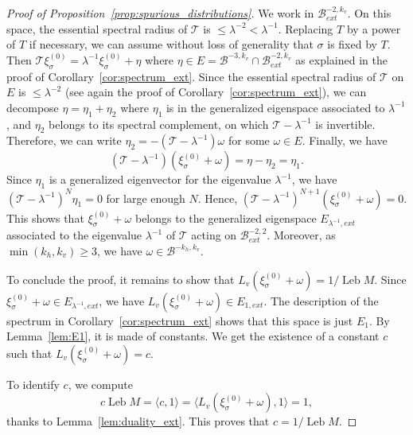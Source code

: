 \documentclass[11pt, a4paper, oneside, final, pagebackref]{amsart}
\newcommand{\boB}{\mathcal{B}}
\newcommand{\boT}{\mathcal{T}}
\DeclareMathOperator{\Leb}{Leb}
\renewcommand{\leq}{\leqslant}
\renewcommand{\geq}{\geqslant}
\theoremstyle{definition}
\numberwithin{equation}{section}
\begin{document}
\begin{proof}[Proof of Proposition~\ref{prop:spurious_distributions}]
We work in $\boB_{ext}^{-2, k_v}$. On this space, the essential spectral
radius of $\boT$ is $\leq \lambda^{-2} < \lambda^{-1}$. Replacing $T$ by a
power of $T$ if necessary, we can assume without loss of generality that
$\sigma$ is fixed by $T$. Then $\boT \xi^{(0)}_\sigma = \lambda^{-1}
\xi^{(0)}_\sigma + \eta$ where $\eta \in E = \boB^{-3, k_v} \cap
\boB_{ext}^{-2,k_v}$ as explained in the proof of
Corollary~\ref{cor:spectrum_ext}. Since the essential spectral radius of
$\boT$ on $E$ is $\leq \lambda^{-2}$ (see again the proof of
Corollary~\ref{cor:spectrum_ext}), we can decompose $\eta = \eta_1 + \eta_2$
where $\eta_1$ is in the generalized eigenspace associated to $\lambda^{-1}$,
and $\eta_2$ belongs to its spectral complement, on which $\boT-\lambda^{-1}$
is invertible. Therefore, we can write $\eta_2 = -(\boT-\lambda^{-1}) \omega$
for some $\omega \in E$. Finally, we have
\begin{equation*}
  (\boT - \lambda^{-1}) (\xi^{(0)}_\sigma + \omega) = \eta - \eta_2 = \eta_1.
\end{equation*}
Since $\eta_1$ is a generalized eigenvector for the eigenvalue
$\lambda^{-1}$, we have $(\boT-\lambda^{-1})^N \eta_1 = 0$ for large enough
$N$. Hence, $(\boT - \lambda^{-1})^{N+1} (\xi^{(0)}_\sigma + \omega) = 0$.
This shows that $\xi^{(0)}_\sigma + \omega$ belongs to the generalized
eigenspace $E_{\lambda^{-1}, ext}$ associated to the eigenvalue
$\lambda^{-1}$ of $\boT$ acting on $\boB^{-2, 2}_{ext}$. Moreover, as
$\min(k_h, k_v)\geq 3$, we have $\omega \in \boB^{-k_h, k_v}$.

To conclude the proof, it remains to show that $L_v(\xi^{(0)}_\sigma +
\omega) = 1/\Leb M$. Since $\xi^{(0)}_\sigma + \omega \in E_{\lambda^{-1},
ext}$, we have $L_v(\xi^{(0)}_\sigma + \omega) \in E_{1,ext}$. The
description of the spectrum in Corollary~\ref{cor:spectrum_ext} shows that
this space is just $E_1$. By Lemma~\ref{lem:E1}, it is made of constants. We
get the existence of a constant $c$ such that $L_v(\xi^{(0)}_\sigma + \omega)
= c$.

To identify $c$, we compute
\begin{equation*}
  c \Leb M = \langle c, 1 \rangle = \langle L_v(\xi^{(0)}_\sigma + \omega), 1\rangle
  = 1,
\end{equation*}
thanks to Lemma~\ref{lem:duality_ext}. This proves that $c = 1/\Leb M$.
\end{proof}
\end{document}
